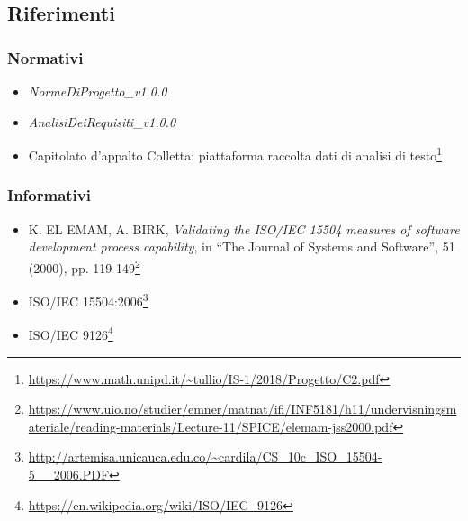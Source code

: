\subsection{Riferimenti}
\subsubsection{Normativi}
\begin{itemize}
\item \textit{NormeDiProgetto\_v1.0.0}
\item \textit{AnalisiDeiRequisiti\_v1.0.0}
\item Capitolato d'appalto Colletta: piattaforma raccolta dati di analisi di testo\footnote{\url{https://www.math.unipd.it/~tullio/IS-1/2018/Progetto/C2.pdf}}
\end{itemize}
\subsubsection{Informativi}
\begin{itemize}
	\item K. EL EMAM, A. BIRK, \textit{Validating the ISO/IEC 15504 measures of software development process capability}, in \enquote{The Journal of Systems and Software}, 51 (2000), pp. 119-149\footnote{\url{https://www.uio.no/studier/emner/matnat/ifi/INF5181/h11/undervisningsmateriale/reading-materials/Lecture-11/SPICE/elemam-jss2000.pdf}}
	\item ISO/IEC 15504:2006\footnote{\url{http://artemisa.unicauca.edu.co/~cardila/CS\_10c\_ISO\_15504-5\_\_2006.PDF}}
	\item ISO/IEC 9126\footnote{\url{https://en.wikipedia.org/wiki/ISO/IEC_9126}}
\end{itemize} 
